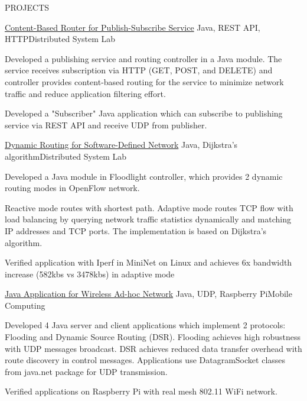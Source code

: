 \documentclass{resume} %
\begin{document}
\begin{rSection}{PROJECTS}
\begin{rSubsection}{\href{https://github.com/kuangyu0801/software-defined-networking-ws20/tree/main/sdn-assign-04}{Content-Based Router for Publish-Subscribe Service}} { Java, REST API, HTTP}{Distributed System Lab}{}
\item Developed a publishing service and routing controller in a Java module.  The service receives subscription via HTTP (GET, POST, and
DELETE) and controller provides content-based routing for the service to minimize network traffic and reduce application filtering effort.
\item Developed a "Subscriber" Java application which can subscribe to publishing service via REST API and receive UDP  from publisher.

\end{rSubsection}

\begin{rSubsection}{\href{https://github.com/kuangyu0801/software-defined-networking-ws20/tree/main/sdn-assign-03}{Dynamic Routing for Software-Defined Network}} {Java, Dijkstra's algorithm}{Distributed System Lab}{}
\item Developed a Java module in Floodlight controller, which provides 2 dynamic routing modes in OpenFlow network. 
\item Reactive mode routes with shortest path. Adaptive mode routes TCP flow with load balancing by querying network traffic statistics dynamically and matching IP addresses and TCP ports. The implementation is based on Dijkstra's algorithm.
\item Verified application with Iperf in MiniNet on Linux and achieves 6x bandwidth increase (582kbs vs 3478kbs) in adaptive mode
\end{rSubsection}

\begin{rSubsection}{\href{https://github.com/kuangyu0801/MobileComputing_SS20_assign04}{Java Application for Wireless Ad-hoc Network}} {Java, UDP, Raspberry Pi}{Mobile Computing}{}
\item Developed 4 Java server and client applications which implement 2 protocols: Flooding and Dynamic Source Routing (DSR). Flooding achieves high robustness with UDP messages broadcast. DSR achieves reduced data transfer overhead with route discovery in control messages. Applications use DatagramSocket classes from java.net package for UDP transmission.
\item Verified applications on Raspberry Pi with real mesh 802.11 WiFi network. 


\end{rSubsection}
\end{rSection}
\end{document}
